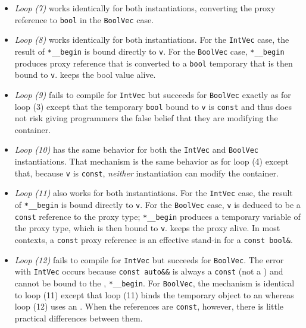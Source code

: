 {{{\begin{itemize}
\item{\emph{Loop (7)} works identically for both instantiations, converting the proxy reference to \lstinline!bool! in the \lstinline!BoolVec! case.}
\item{\emph{Loop (8)} works identically for both instantiations. For the \lstinline!IntVec! case, the result of \lstinline!*__begin! is bound directly to \lstinline!v!. For the \lstinline!BoolVec! case, \lstinline!*__begin! produces proxy reference that is converted to a \lstinline!bool! temporary that is then bound to \lstinline!v!.  keeps the bool value alive.}
\item{\emph{Loop (9)} fails to compile for \lstinline!IntVec! but succeeds for \lstinline!BoolVec! exactly as for loop (3) except that the temporary \lstinline!bool! bound to \lstinline!v! is \lstinline!const! and thus does not risk giving programmers the false belief that they are modifying the container.}
\item{\emph{Loop (10)} has the same behavior for both the \lstinline!IntVec! and \lstinline!BoolVec! instantiations. That mechanism is the same behavior as for loop (4) except that, because \lstinline!v! is \lstinline!const!, \emph{neither} instantiation can modify the container.}
\item{\emph{Loop (11)} also works for both instantiations. For the \lstinline!IntVec! case, the result of \lstinline!*__begin! is bound directly to \lstinline!v!. For the \lstinline!BoolVec! case, \lstinline!v! is deduced to be a \lstinline!const! reference to the proxy type; \lstinline!*__begin! produces a temporary variable of the proxy type, which is then bound to \lstinline!v!.  keeps the proxy alive. In most contexts, a \lstinline!const! proxy reference is an effective stand-in for a \lstinline!const!~\lstinline!bool&!.}
\item{\emph{Loop (12)} fails to compile for \lstinline!IntVec! but succeeds for \lstinline!BoolVec!. The error with \lstinline!IntVec! occurs because \lstinline!const!~\lstinline!auto&&! is always a \lstinline!const!  (not a ) and cannot be bound to the , \lstinline!*__begin!. For \lstinline!BoolVec!, the mechanism is identical to loop (11) except that loop (11) binds the temporary object to an  whereas loop (12) uses an . When the references are \lstinline!const!, however, there is little practical differences between them.}
\end{itemize}

}}}
